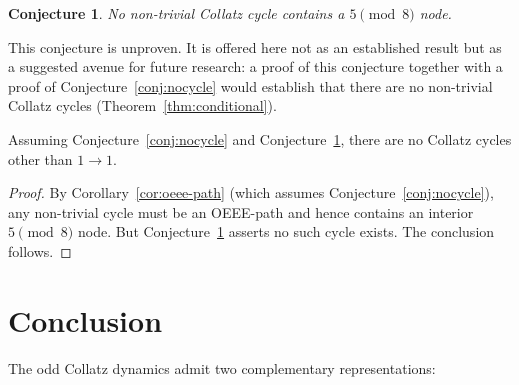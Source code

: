 \documentclass[11pt]{article}
\newtheorem{conjecture}{Conjecture}
\begin{document}
\begin{conjecture}
\label{conj:nocycle5}
No non-trivial Collatz cycle contains a $5\pmod{8}$ node.
\end{conjecture}

This conjecture is unproven.  It is offered here not as an established result
but as a suggested avenue for future research: a proof of this conjecture
together with a proof of Conjecture~\ref{conj:nocycle} would establish that
there are no non-trivial Collatz cycles (Theorem~\ref{thm:conditional}).

\begin{theorem}
\label{thm:conditional}
Assuming Conjecture~\ref{conj:nocycle} and Conjecture~\ref{conj:nocycle5},
there are no Collatz cycles other than $1\to 1$.
\end{theorem}

\begin{proof}
By Corollary~\ref{cor:oeee-path} (which assumes Conjecture~\ref{conj:nocycle}),
any non-trivial cycle must be an OEEE-path and hence contains an interior
$5\pmod{8}$ node.  But Conjecture~\ref{conj:nocycle5} asserts no such cycle
exists.  The conclusion follows.
\end{proof}

\section{Conclusion}

The odd Collatz dynamics admit two complementary representations:
\end{document}
